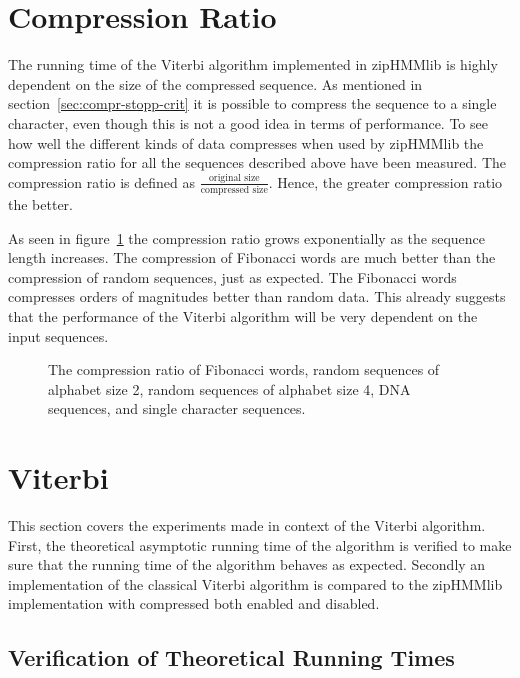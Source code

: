 \section{Compression Ratio}
\label{sec:compression-ratio}

The running time of the Viterbi algorithm implemented in zipHMMlib is highly
dependent on the size of the compressed sequence. As mentioned in
section~\ref{sec:compr-stopp-crit} it is possible to compress the sequence to a
single character, even though this is not a good idea in terms of
performance. To see how well the different kinds of data compresses when used
by zipHMMlib the compression ratio for all the sequences described above have
been measured. The compression ratio is defined as
$\frac{\text{original size}}{\text{compressed size}}$. Hence, the greater
compression ratio the better.

As seen in figure~\ref{fig:compression_ratio} the compression ratio grows
exponentially as the sequence length increases. The compression of Fibonacci
words are much better than the compression of random sequences, just as
expected. The Fibonacci words compresses orders of magnitudes better than
random data. This already suggests that the performance of the Viterbi
algorithm will be very dependent on the input sequences.  

\begin{figure}
  \centering
  
  \caption{The compression ratio of Fibonacci words, random sequences of
    alphabet size 2, random sequences of alphabet size 4, DNA
    sequences, and single character sequences.}
  \label{fig:compression_ratio}
\end{figure}

\section{Viterbi}

This section covers the experiments made in context of the Viterbi
algorithm. First, the theoretical asymptotic running time of the algorithm is
verified to make sure that the running time of the algorithm behaves as
expected. Secondly an implementation of the classical Viterbi algorithm is
compared to the zipHMMlib implementation with compressed both enabled and
disabled.

\subsection{Verification of Theoretical Running Times}
\label{sec:theor-runn-times}

